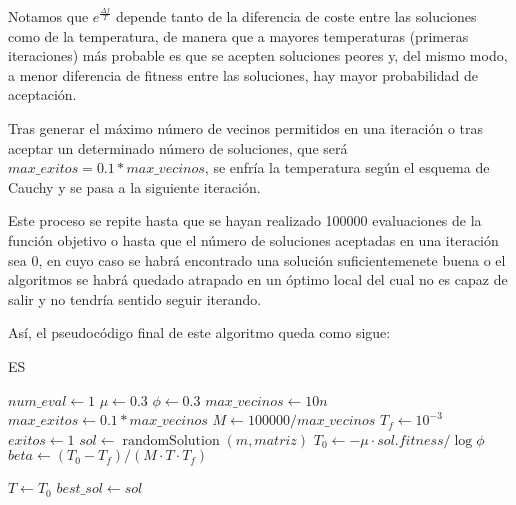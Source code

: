 \documentclass[11pt,a4paper]{article}
\begin{document}
Notamos que $e^{\frac{\Delta f}{T}}$ depende tanto de la diferencia de coste entre las soluciones como de la temperatura, de manera que a mayores temperaturas (primeras iteraciones) más probable es que se acepten soluciones peores y, del mismo modo, a menor diferencia de fitness entre las soluciones, hay mayor probabilidad de aceptación. 

Tras generar el máximo número de vecinos permitidos en una iteración o tras aceptar un determinado número de soluciones, que será $max\_exitos=0.1*max\_vecinos$, se enfría la temperatura según el esquema de Cauchy y se pasa a la siguiente iteración. 

Este proceso se repite hasta que se hayan realizado 100000 evaluaciones de la función objetivo o hasta que el número de soluciones aceptadas en una iteración sea 0, en cuyo caso se habrá encontrado una solución suficientemenete buena o el algoritmos se habrá quedado atrapado en un óptimo local del cual no es capaz de salir y no tendría sentido seguir iterando. 

Así, el pseudocódigo final de este algoritmo queda como sigue: 

\begin{algorithm}[H]
	\DontPrintSemicolon
	\caption{\sc ES}
	$num\_eval\gets 1$ 
	$\mu\gets 0.3$\;
	$\phi\gets 0.3$\;
	$max\_vecinos\gets 10n$\;
	$max\_exitos\gets 0.1*max\_vecinos$\;
	$M\gets 100000/max\_vecinos$\;
	$T_f\gets 10^{-3}$\;
	$exitos\gets 1$ 
	$sol\gets \operatorname{randomSolution}(m,matriz)$\;
	$T_0\gets -\mu\cdot sol.fitness/\log \phi$ 
	$beta\gets (T_0-T_f)/(M\cdot T\cdot T_f)$\;

	$T\gets T_0$\;
	$best\_sol\gets sol$\;
	
	\;
\end{algorithm}
\end{document}

